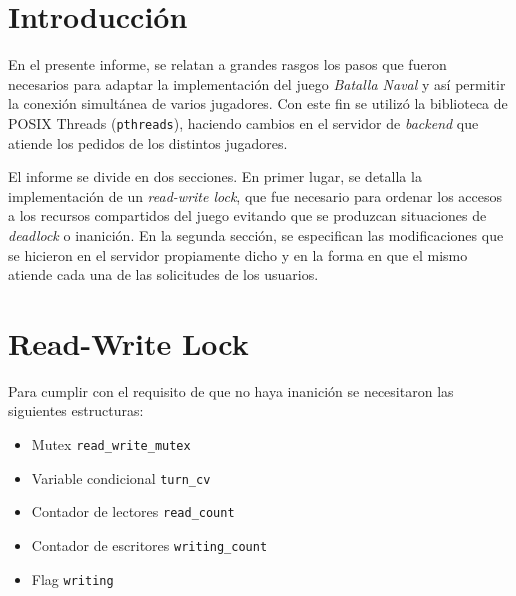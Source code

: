 \documentclass[a4paper]{article}
\begin{document}

\maketitle
\thispagestyle{empty}

\newpage
\section{Introducción}
En el presente informe, se relatan a grandes rasgos los pasos que fueron
necesarios para adaptar la implementación del juego \emph{Batalla Naval} y así
permitir la conexión simultánea de varios jugadores. Con este fin
se utilizó la biblioteca de POSIX Threads (\texttt{pthreads}), haciendo
cambios en el servidor de \emph{backend} que atiende los pedidos de los
distintos jugadores.

El informe se divide en dos secciones. En primer lugar, se detalla la
implementación de un \emph{read-write lock}, que fue necesario para ordenar
los accesos a los recursos compartidos del juego evitando que se produzcan
situaciones de \emph{deadlock} o inanición. En la segunda sección, se
especifican las modificaciones que se hicieron en el servidor propiamente
dicho y en la forma en que el mismo atiende cada una de las solicitudes de los
usuarios.

\section{Read-Write Lock}
Para cumplir con el requisito de que no haya inanición se necesitaron las
siguientes estructuras:

\begin{itemize}
    \item{Mutex \texttt{read\_write\_mutex}}
    \item{Variable condicional \texttt{turn\_cv}}
    \item{Contador de lectores \texttt{read\_count}}
    \item{Contador de escritores \texttt{writing\_count}}
    \item{Flag \texttt{writing}}
\end{itemize}
\end{document}
